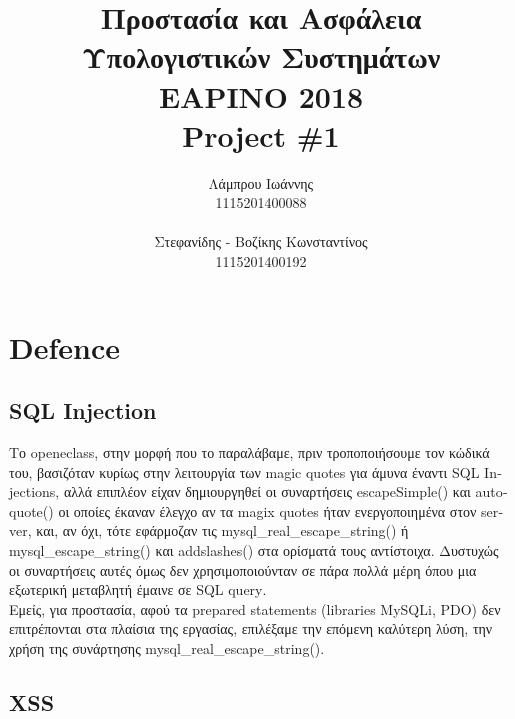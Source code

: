 \documentclass{article}
\begin{document}
\title{\vspace{-3.5cm}\textbf{Προστασία και Ασφάλεια Υπολογιστικών Συστημάτων \\ΕΑΡΙΝΟ 2018\\ \textlatin{Project \#}1}}
\author{Λάμπρου Ιωάννης \\1115201400088\\\\ Στεφανίδης - Βοζίκης Κωνσταντίνος \\1115201400192}

\maketitle
\section*{\textlatin{Defence}}
\subsection*{\textlatin{SQL Injection}}
Το \textlatin{openeclass}, στην μορφή που το παραλάβαμε, πριν τροποποιήσουμε τον κώδικά του, βασιζόταν κυρίως στην λειτουργία των \textlatin{magic quotes} για άμυνα έναντι \textlatin{SQL Injections}, αλλά επιπλέον είχαν δημιουργηθεί οι συναρτήσεις \textlatin{escapeSimple()} και \textlatin{autoquote()} οι οποίες έκαναν έλεγχο αν τα \textlatin{magix quotes} ήταν ενεργοποιημένα στον \textlatin{server}, και, αν όχι, τότε εφάρμοζαν τις \textlatin{mysql_real_escape_string()} ή \textlatin{mysql_escape_string()} και \textlatin{addslashes()} στα ορίσματά τους αντίστοιχα. Δυστυχώς οι συναρτήσεις αυτές όμως δεν χρησιμοποιούνταν σε πάρα πολλά μέρη όπου μια εξωτερική μεταβλητή έμαινε σε \textlatin{SQL query}. \\
Εμείς, για προστασία, αφού τα \textlatin{prepared statements (libraries MySQLi, PDO)} δεν επιτρέπονται στα πλαίσια της εργασίας, επιλέξαμε την επόμενη καλύτερη λύση, την χρήση της συνάρτησης \textlatin{mysql_real_escape_string()}.


\subsection*{\textlatin{XSS}}
\end{document}
